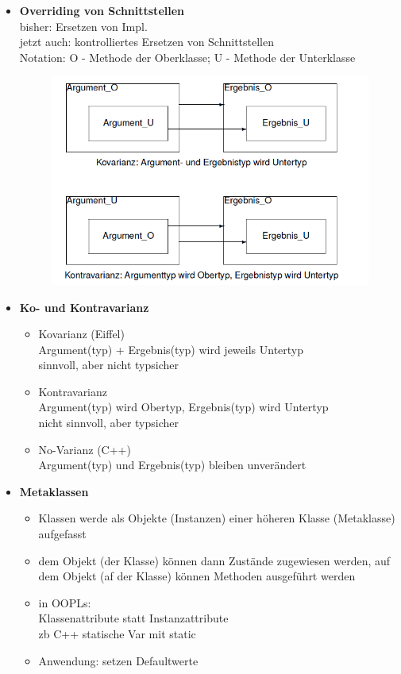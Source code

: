 \begin{itemize}
	\item \textbf{Overriding von Schnittstellen}\\
	bisher: Ersetzen von Impl.\\
	jetzt auch: kontrolliertes Ersetzen von Schnittstellen\\
	Notation: O - Methode der Oberklasse; U - Methode der Unterklasse
	
	\begin{figure}[!h]
		\centering
		\includegraphics[scale=0.6]{img/ko_varianz.png}
	\end{figure}
	
	\item \textbf{Ko- und Kontravarianz}
	\begin{itemize}
		\item Kovarianz (Eiffel)\\
		Argument(typ) + Ergebnis(typ) wird jeweils Untertyp\\
		sinnvoll, aber nicht typsicher
		
		\item Kontravarianz\\
		Argument(typ) wird Obertyp, Ergebnis(typ) wird Untertyp\\
		nicht sinnvoll, aber typsicher
		
		\item No-Varianz (C++)\\
		Argument(typ) und Ergebnis(typ) bleiben unverändert
	\end{itemize}
	
	\item \textbf{Metaklassen}
	\begin{itemize}
		\item Klassen werde als Objekte (Instanzen) einer höheren Klasse (Metaklasse) aufgefasst
		\item dem Objekt (der Klasse) können dann Zustände zugewiesen werden, auf dem Objekt (af der Klasse) können Methoden ausgeführt werden
		\item in OOPLs:\\
		Klassenattribute statt Instanzattribute\\
		zb C++ statische Var mit static
		\item Anwendung: setzen Defaultwerte
		

\end{itemize}
\end{itemize}
